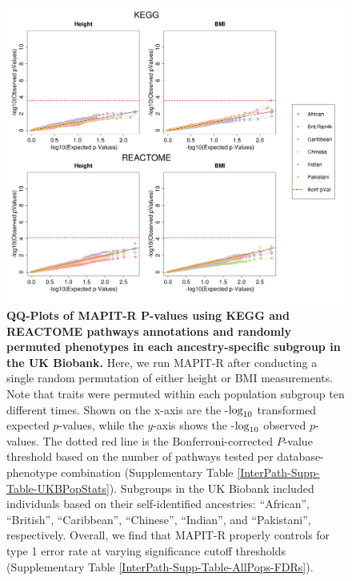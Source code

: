 \documentclass[10pt]{article}
\def\log{{\rm log}}
\begin{document}
\begin{figure}[htbp]
\centering
\includegraphics[width = \textwidth]{Images/Supp/InterPath_Supp_Figure_perm1_QQPlots_AllPaths_vs2.png}
\caption{\textbf{QQ-Plots of MAPIT-R $\bm{P}$-values using KEGG and REACTOME pathways annotations and randomly permuted phenotypes in each ancestry-specific subgroup in the UK Biobank.} Here, we run MAPIT-R after conducting a single random permutation of either height or BMI measurements. Note that traits were permuted within each population subgroup ten different times. Shown on the x-axis are the -$\log_{10}$ transformed expected $p$-values, while the $y$-axis shows the -$\log_{10}$ observed $p$-values. The dotted red line is the Bonferroni-corrected $P$-value threshold based on the number of pathways tested per database-phenotype combination (Supplementary Table \ref{InterPath-Supp-Table-UKBPopStats}). Subgroups in the UK Biobank included individuals based on their self-identified ancestries: ``African'', ``British'', ``Caribbean'', ``Chinese'', ``Indian'', and ``Pakistani'', respectively. Overall, we find that MAPIT-R properly controls for type 1 error rate at varying significance cutoff thresholds (Supplementary Table \ref{InterPath-Supp-Table-AllPops-FDRs}).}
\label{InterPath-Supp-Figure-perm1-QQPlots-AllPaths}
\end{figure}
\clearpage
\end{document}
